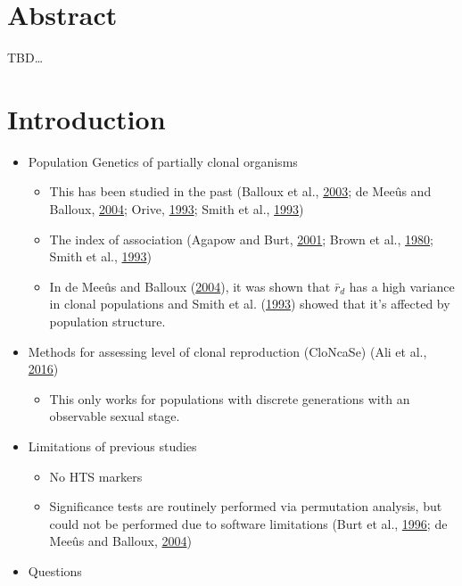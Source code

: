 \documentclass[double,12pt]{beavtex}
\providecommand{\tightlist}{%
  \setlength{\itemsep}{0pt}\setlength{\parskip}{0pt}}
\begin{document}
  \section{Abstract}\label{abstract-4}
  
  TBD\ldots{}
  
  \section{Introduction}\label{introduction-4}
  
  \begin{itemize}
  \tightlist
  \item
    Population Genetics of partially clonal organisms
  
    \begin{itemize}
    \tightlist
    \item
      This has been studied in the past (Balloux et al.,
      \protect\hyperlink{ref-balloux2003population}{2003}; de Meeûs and
      Balloux, \protect\hyperlink{ref-de2004clonal}{2004}; Orive,
      \protect\hyperlink{ref-orive1993effective}{1993}; Smith et al.,
      \protect\hyperlink{ref-smith1993how}{1993})
    \item
      The index of association (Agapow and Burt,
      \protect\hyperlink{ref-Agapowux5f2001}{2001}; Brown et al.,
      \protect\hyperlink{ref-brown1980multilocus}{1980}; Smith et al.,
      \protect\hyperlink{ref-smith1993how}{1993})
    \item
      In de Meeûs and Balloux
      (\protect\hyperlink{ref-de2004clonal}{2004}), it was shown that
      \(\bar{r}_d\) has a high variance in clonal populations and Smith et
      al. (\protect\hyperlink{ref-smith1993how}{1993}) showed that it's
      affected by population structure.
    \end{itemize}
  \item
    Methods for assessing level of clonal reproduction (CloNcaSe) (Ali et
    al., \protect\hyperlink{ref-ali2016cloncase}{2016})
  
    \begin{itemize}
    \tightlist
    \item
      This only works for populations with discrete generations with an
      observable sexual stage.
    \end{itemize}
  \item
    Limitations of previous studies
  
    \begin{itemize}
    \tightlist
    \item
      No HTS markers
    \item
      Significance tests are routinely performed via permutation analysis,
      but could not be performed due to software limitations (Burt et al.,
      \protect\hyperlink{ref-burt1996molecular}{1996}; de Meeûs and
      Balloux, \protect\hyperlink{ref-de2004clonal}{2004})
    \end{itemize}
  \item
    Questions
  

\end{itemize}
\end{document}
